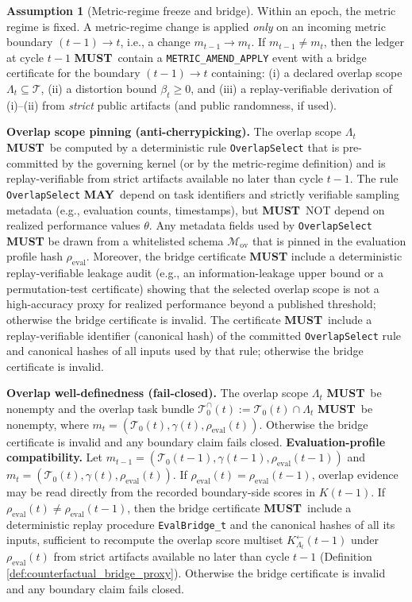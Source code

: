\documentclass[11pt,a4paper]{article}
\newcommand{\MUST}{\textbf{MUST}}
\newcommand{\MAY}{\textbf{MAY}}
\newcommand{\cT}{\mathcal{T}}
\theoremstyle{definition}
\newtheorem{assumption}{Assumption}
\theoremstyle{remark}
\begin{document}
\begin{assumption}[Metric-regime freeze and bridge]\label{ass:metricfreeze}
Within an epoch, the metric regime is fixed.
A metric-regime change is applied \emph{only} on an incoming metric boundary $(t-1)\to t$, i.e., a change $m_{t-1}\to m_t$.
If $m_{t-1}\ne m_t$, then the ledger at cycle $t-1$ \MUST\ contain a \texttt{METRIC\_AMEND\_APPLY} event with a bridge certificate for the boundary $(t-1)\to t$ containing:
(i) a declared overlap scope $\Lambda_t\subseteq \cT$,
(ii) a distortion bound $\beta_t\ge 0$, and
(iii) a replay-verifiable derivation of (i)--(ii) from \emph{strict} public artifacts (and public randomness, if used).

\noindent\textbf{Overlap scope pinning (anti-cherrypicking).}
The overlap scope $\Lambda_t$ \MUST\ be computed by a deterministic rule \texttt{OverlapSelect} that is pre-committed by the governing kernel (or by the metric-regime definition) and is replay-verifiable from strict artifacts available no later than cycle $t-1$.
The rule \texttt{OverlapSelect} \MAY\ depend on task identifiers and strictly verifiable sampling metadata (e.g., evaluation counts, timestamps), but \MUST\ NOT depend on realized performance values $\theta$.
Any metadata fields used by \texttt{OverlapSelect} \MUST{} be drawn from a whitelisted schema $\mathcal M_{\mathrm{ov}}$ that is pinned in the evaluation profile hash $\rho_{\mathrm{eval}}$.
Moreover, the bridge certificate \MUST{} include a deterministic replay-verifiable leakage audit (e.g., an information-leakage upper bound or a permutation-test certificate) showing that the selected overlap scope is not a high-accuracy proxy for realized performance beyond a published threshold; otherwise the bridge certificate is invalid.
The certificate \MUST\ include a replay-verifiable identifier (canonical hash) of the committed \texttt{OverlapSelect} rule and canonical hashes of all inputs used by that rule; otherwise the bridge certificate is invalid.

\noindent\textbf{Overlap well-definedness (fail-closed).}
The overlap scope $\Lambda_t$ \MUST\ be nonempty and the overlap task bundle $\cT_0^{\cap}(t):=\cT_0(t)\cap \Lambda_t$ \MUST\ be nonempty, where $m_t=(\cT_0(t),\gamma(t),\rho_{\mathrm{eval}}(t))$.
Otherwise the bridge certificate is invalid and any boundary claim fails closed.
\noindent\textbf{Evaluation-profile compatibility.}
Let $m_{t-1}=(\cT_0(t-1),\gamma(t-1),\rho_{\mathrm{eval}}(t-1))$ and $m_t=(\cT_0(t),\gamma(t),\rho_{\mathrm{eval}}(t))$.
If $\rho_{\mathrm{eval}}(t)=\rho_{\mathrm{eval}}(t-1)$, overlap evidence may be read directly from the recorded boundary-side scores in $K(t-1)$.
If $\rho_{\mathrm{eval}}(t)\neq\rho_{\mathrm{eval}}(t-1)$, then the bridge certificate \MUST\ include a deterministic replay procedure \texttt{EvalBridge\_t} and the canonical hashes of all its inputs, sufficient to recompute the overlap score multiset $K^{\leftarrow}_{\Lambda_t}(t-1)$ under $\rho_{\mathrm{eval}}(t)$ from strict artifacts available no later than cycle $t-1$ (Definition \ref{def:counterfactual_bridge_proxy}).
Otherwise the bridge certificate is invalid and any boundary claim fails closed.



\end{assumption}
\end{document}
